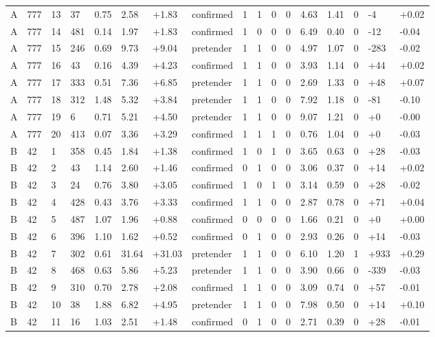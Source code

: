 \documentclass[11pt,a4paper]{article}
\begin{document}
{\begin{longtable}[]{@{}lllllllllllllllll@{}}
A & 777 & 13 & 37 & 0.75 & 2.58 & +1.83 & confirmed & 1 & 1 & 0 & 0 & 4.63 & 1.41 & 0 & -4 & +0.02 \\
A & 777 & 14 & 481 & 0.14 & 1.97 & +1.83 & confirmed & 1 & 0 & 0 & 0 & 6.49 & 0.40 & 0 & -12 & -0.04 \\
A & 777 & 15 & 246 & 0.69 & 9.73 & +9.04 & pretender & 1 & 1 & 0 & 0 & 4.97 & 1.07 & 0 & -283 & -0.02 \\
A & 777 & 16 & 43 & 0.16 & 4.39 & +4.23 & confirmed & 1 & 1 & 0 & 0 & 3.93 & 1.14 & 0 & +44 & +0.02 \\
A & 777 & 17 & 333 & 0.51 & 7.36 & +6.85 & pretender & 1 & 1 & 0 & 0 & 2.69 & 1.33 & 0 & +48 & +0.07 \\
A & 777 & 18 & 312 & 1.48 & 5.32 & +3.84 & pretender & 1 & 1 & 0 & 0 & 7.92 & 1.18 & 0 & -81 & -0.10 \\
A & 777 & 19 & 6 & 0.71 & 5.21 & +4.50 & pretender & 1 & 1 & 0 & 0 & 9.07 & 1.21 & 0 & +0 & -0.00 \\
A & 777 & 20 & 413 & 0.07 & 3.36 & +3.29 & confirmed & 1 & 1 & 1 & 0 & 0.76 & 1.04 & 0 & +0 & -0.03 \\
B & 42 & 1 & 358 & 0.45 & 1.84 & +1.38 & confirmed & 1 & 0 & 1 & 0 & 3.65 & 0.63 & 0 & +28 & -0.03 \\
B & 42 & 2 & 43 & 1.14 & 2.60 & +1.46 & confirmed & 0 & 1 & 0 & 0 & 3.06 & 0.37 & 0 & +14 & +0.02 \\
B & 42 & 3 & 24 & 0.76 & 3.80 & +3.05 & confirmed & 1 & 0 & 1 & 0 & 3.14 & 0.59 & 0 & +28 & -0.02 \\
B & 42 & 4 & 428 & 0.43 & 3.76 & +3.33 & confirmed & 1 & 1 & 0 & 0 & 2.87 & 0.78 & 0 & +71 & +0.04 \\
B & 42 & 5 & 487 & 1.07 & 1.96 & +0.88 & confirmed & 0 & 0 & 0 & 0 & 1.66 & 0.21 & 0 & +0 & +0.00 \\
B & 42 & 6 & 396 & 1.10 & 1.62 & +0.52 & confirmed & 0 & 1 & 0 & 0 & 2.93 & 0.26 & 0 & +14 & -0.03 \\
B & 42 & 7 & 302 & 0.61 & 31.64 & +31.03 & pretender & 1 & 1 & 0 & 0 & 6.10 & 1.20 & 1 & +933 & +0.29 \\
B & 42 & 8 & 468 & 0.63 & 5.86 & +5.23 & pretender & 1 & 1 & 0 & 0 & 3.90 & 0.66 & 0 & -339 & -0.03 \\
B & 42 & 9 & 310 & 0.70 & 2.78 & +2.08 & confirmed & 1 & 1 & 0 & 0 & 3.09 & 0.74 & 0 & +57 & -0.01 \\
B & 42 & 10 & 38 & 1.88 & 6.82 & +4.95 & pretender & 1 & 1 & 0 & 0 & 7.98 & 0.50 & 0 & +14 & +0.10 \\
B & 42 & 11 & 16 & 1.03 & 2.51 & +1.48 & confirmed & 0 & 1 & 0 & 0 & 2.71 & 0.39 & 0 & +28 & -0.01 \\

\end{longtable}}
\end{document}
